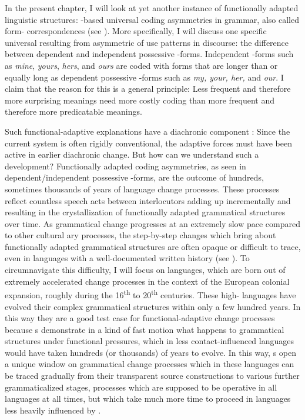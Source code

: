 \documentclass[output=paper]{langsci/langscibook}
\begin{document}
In the present chapter, I will look at yet another instance of functionally adapted linguistic structures: -based universal coding asymmetries in grammar, also called form- correspondences (see ). More specifically, I will discuss one specific universal  resulting from asymmetric  of use patterns in discourse: the difference between dependent and independent possessive -forms. Independent -forms such as \textit{mine}, \textit{yours}, \textit{hers}, and \textit{ours} are coded with forms that are longer than or equally long as dependent possessive -forms such as \textit{my, your, her,} and \textit{our}. I claim that the reason for this is a general  principle: Less frequent and therefore more surprising meanings need more costly coding than more frequent and therefore more predicatable meanings. 

Such functional-adaptive explanations have a diachronic component \citep{Bybee1988}: Since the current system is often rigidly conventional, the adaptive forces must have been active in earlier diachronic change. But how can we understand such a development? Functionally adapted coding asymmetries, as seen in dependent/independent possessive -forms, are the outcome of hundreds, sometimes thousands of years of language change processes. These processes reflect countless speech acts between interlocutors adding up incrementally and resulting in the crystallization of functionally adapted grammatical structures over time. As grammatical change progresses at an extremely slow pace compared to other cultural ary processes, the step-by-step changes which bring about functionally adapted grammatical structures are often opaque or difficult to trace, even in languages with a well-documented written history (see ). To circumnavigate this difficulty, I will focus on  languages, which are born out of extremely accelerated change processes in the context of the European colonial expansion, roughly during the 16\textsuperscript{th} to 20\textsuperscript{th} centuries. These high- languages have evolved their complex grammatical structures within only a few hundred years. In this way they are a good test case for functional-adaptive change processes because s demonstrate in a kind of fast motion what happens to grammatical structures under functional pressures, which in less contact-influenced languages would have taken hundreds (or thousands) of years to evolve. In this way, s open a unique window on grammatical change processes which in these languages can be traced gradually from their transparent source constructions to various further grammaticalized stages, processes which are supposed to be operative in all languages at all times, but which take much more time to proceed in languages less heavily influenced by . 
\end{document}
